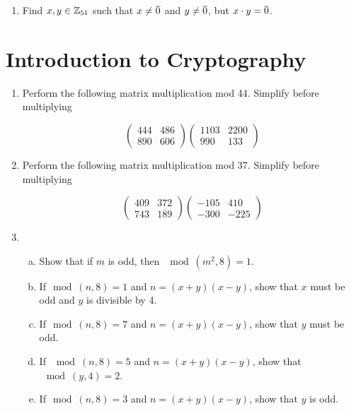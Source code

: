 \begin{enumerate}
\item
Find $x,y \in \mathbb{Z}_{51}$ such that $x \neq \overline{0}$ and $y \neq \overline{0}$, but $x \cdot y = \overline{0}$.


\end{enumerate}

\section{Introduction to Cryptography}

\begin{enumerate}

\item
Perform the following matrix multiplication mod 44. Simplify before multiplying

$$\left(
\begin{array}{cc}
444 & 486 \\
890 & 606
\end{array}
\right)
\left(
\begin{array}{cc}
1103 & 2200 \\
990 & 133
\end{array}
\right)$$

\item
Perform the following matrix multiplication mod 37. Simplify before multiplying

$$\left(
\begin{array}{cc}
409 & 372 \\
743 & 189
\end{array}
\right)
\left(
\begin{array}{cc}
-105 & 410 \\
 -300& -225
\end{array}
\right)$$

\item
\begin{enumerate}[(a)]
\item
Show that if $m$ is odd, then $\mod(m^2,8) = 1$.

\item
If$\mod(n,8)=1$ and $n = (x+y)(x-y)$, show that  $x$ must be odd and $y$ is divisible by 4.

\item
If$\mod(n,8)=7$ and $n = (x+y)(x-y)$, show that  $y$ must be odd.

\item
If $\mod(n,8)=5$ and $n = (x+y)(x-y)$, show that  $\mod(y,4) = 2$.

\item
If$\mod(n,8)=3$ and $n = (x+y)(x-y)$, show that  $y$ is odd.
\end{enumerate}


\end{enumerate}
